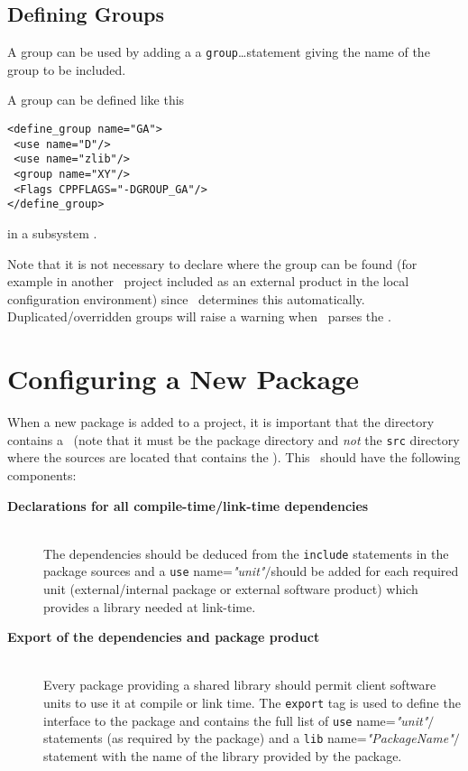 \subsection{Defining Groups}\label{sec:defininggroups}
A group can be used by adding a a \lbkt\texttt{group}\dots\rbkt statement
giving the name of the group to be included. 

\ni A group can be defined like this

\small{
\begin{verbatim}
<define_group name="GA">
 <use name="D"/>
 <use name="zlib"/>
 <group name="XY"/>
 <Flags CPPFLAGS="-DGROUP_GA"/>
</define_group>
\end{verbatim}
}\normalsize 

\ni in a subsystem \buildfile.

\ni Note that it is not necessary to declare where the group can be
found (for example in another \scram\ project included as an
external product in the local configuration environment) since \scram\
determines this automatically. Duplicated/overridden groups will raise
a warning when \scram\ parses the \buildfile.

\section{Configuring a New Package}
\label{sec:exportingsoftwareunits}

When a new package is added to a project, it is important that the
directory contains a \buildfile\ (note that it must be the package
directory and \textit{not} the \texttt{src} directory where the
sources are located that contains the \buildfile).
This \buildfile\ should have the following components:
\begin{description}
\item[\textbf{Declarations for all compile-time/link-time dependencies}]\mbox{}\\
  The dependencies should be deduced from the \texttt{include}
  statements in the package sources and a \lbkt\texttt{use}
  name=\textit{"unit"}$/$\rbkt should be added for each required unit
  (external/internal package or external software product) which
  provides a library needed at link-time.
\item[\textbf{Export of the dependencies and package product}]\mbox{}\\
  Every package providing a shared library should permit client software
  units to use it at compile or link time. The
  \lbkt\texttt{export}\rbkt{} tag is used to define the
  interface to the package and contains the full list of 
  \lbkt\texttt{use} name=\textit{"unit"}$/$\rbkt statements (as required
  by the package) and a \lbkt\texttt{lib} name=\textit{"PackageName"}$/$\rbkt
  statement with the name of the library provided by the package.
\end{description}

